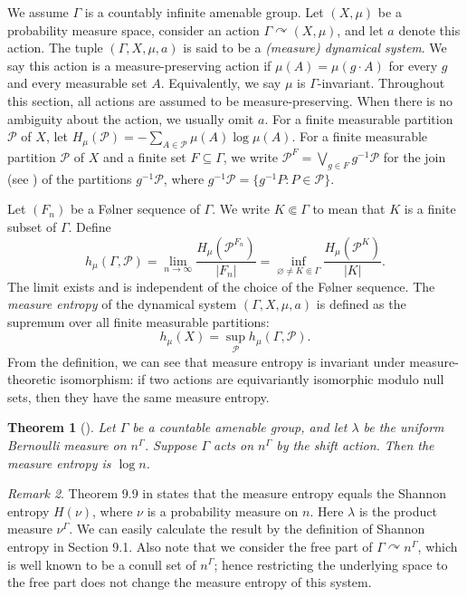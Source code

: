 \documentclass[11pt, reqno, a4paper]{amsart}
\theoremstyle{plain}
\newtheorem{theorem}{Theorem}[section]
\theoremstyle{definition}
\theoremstyle{remark}
\newtheorem{remark}[theorem]{Remark}
\begin{document}
 We assume $\Gamma$ is a countably infinite amenable group. Let $(X, \mu)$ be a probability measure space, consider an action $\Gamma \curvearrowright (X, \mu)$, and let $a$ denote this action. The tuple $(\Gamma,X,\mu,a)$ is said to be a \textit{(measure) dynamical system}.
 We say this action is a measure-preserving action if $\mu(A)=\mu(g\cdot A)$ for every $g$ and every measurable set $A$. Equivalently, we say $\mu$ is $\Gamma$-invariant. Throughout this section, all actions  are assumed to be measure-preserving. When there is no ambiguity about the action, we usually omit $a$. 
 For a finite measurable partition $\mathcal{P}$ of $X$, let $H_\mu(\mathcal{P}) = -\sum_{A \in \mathcal{P}} \mu(A) \log \mu(A)$. For a finite measurable partition $\mathcal{P}$ of $X$ and a finite set $F\subseteq\Gamma$, we write $\mathcal{P}^F=\bigvee_{g\in F}g^{-1}\mathcal{P} $ for the join (see \cite[page 2]{KL16}) of the partitions $g^{-1}\mathcal{P}$, where $ g^{-1}\mathcal{P}=\{g^{-1}P:P\in\mathcal{P}\}. $

Let $(F_n)$ be a F{\o}lner sequence of $\Gamma$. We write $K\Subset\Gamma$ to mean that $K$ is a finite subset of $\Gamma$.
Define
    \[
    h_{\mu}(\Gamma, \mathcal{P}) = \lim_{n\to\infty} \frac{H_\mu(\mathcal{P}^{F_n})}{|F_n|} =\inf_{\varnothing\ne K\Subset\Gamma}\frac{H_\mu(\mathcal{P}^K)}{|K|}.
    \]
The limit exists and is independent of the choice of the F{\o}lner sequence. The \textit{measure entropy} of the dynamical system $(\Gamma,X,\mu,a)$ is defined as the supremum  over all finite measurable partitions:
    \[
    h_{\mu}(X) = \sup_{\mathcal{P}} h_{\mu}(\Gamma, \mathcal{P}).
    \]
From the definition, we can see that measure entropy is invariant under measure-theoretic isomorphism: if two actions are equivariantly isomorphic modulo null sets, then they have the same measure entropy.


\begin{theorem}[{\cite[Theorem 9.9]{KL16}}]
Let $\Gamma$ be a countable amenable group, and let $\lambda$ be the uniform Bernoulli measure on $n^\Gamma$. Suppose $\Gamma$ acts on $n^\Gamma$ by the shift action. Then the measure entropy is $\log n$.
\end{theorem}
\begin{remark}
Theorem 9.9 in \cite{KL16} states that the measure entropy equals the Shannon entropy $H(\nu)$, where $\nu$ is a probability measure on $n$. Here $\lambda$ is the product measure $\nu^\Gamma$. We can easily calculate the result by the definition of Shannon entropy in Section 9.1. Also note that we consider the free part of $\Gamma \curvearrowright n^\Gamma$, which is well known to be a conull set of $n^\Gamma$; hence restricting the underlying space to the free part does not change the measure entropy of this system. 
\end{remark}
 
\end{document}
